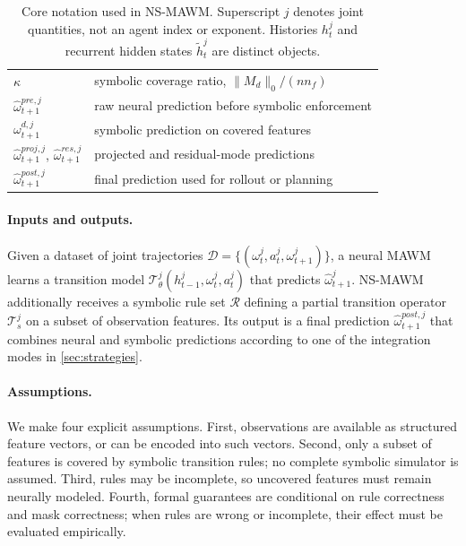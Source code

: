 \documentclass{article}
\theoremstyle{plain}
\theoremstyle{definition}
\theoremstyle{remark}
\begin{document}
\begin{table}[t]
\begin{tabular}{ll}
    $\kappa$                                                    & symbolic coverage ratio, $\|M_d\|_0/(n n_f)$          \\
    $\hat{\omega}^{pre,j}_{t+1}$                                & raw neural prediction before symbolic enforcement     \\
    $\omega^{d,j}_{t+1}$                                        & symbolic prediction on covered features               \\
    $\hat{\omega}^{proj,j}_{t+1}$, $\hat{\omega}^{res,j}_{t+1}$ & projected and residual-mode predictions               \\
    $\hat{\omega}^{post,j}_{t+1}$                               & final prediction used for rollout or planning         \\
    \bottomrule
  \end{tabular}
  \caption{Core notation used in NS-MAWM. Superscript $j$ denotes joint quantities, not an agent index or exponent. Histories $h_t^j$ and recurrent hidden states $\tilde{h}_t^j$ are distinct objects.}
  \label{tab:notation}
\end{table}

\paragraph{Inputs and outputs.}
Given a dataset of joint trajectories
$\mathcal{D}=\{(\omega^j_t,a^j_t,\omega^j_{t+1})\}$,
a neural MAWM learns a transition model
$\mathcal{T}^j_\theta(h^j_{t-1},\omega^j_t,a^j_t)$
that predicts $\hat{\omega}^j_{t+1}$.
NS-MAWM additionally receives a symbolic rule set $\mathcal{R}$ defining a partial transition operator $\mathcal{T}^j_s$ on a subset of observation features. Its output is a final prediction $\hat{\omega}^{post,j}_{t+1}$ that combines neural and symbolic predictions according to one of the integration modes in \autoref{sec:strategies}.

\paragraph{Assumptions.}
We make four explicit assumptions. First, observations are available as structured feature vectors, or can be encoded into such vectors. Second, only a subset of features is covered by symbolic transition rules; no complete symbolic simulator is assumed. Third, rules may be incomplete, so uncovered features must remain neurally modeled. Fourth, formal guarantees are conditional on rule correctness and mask correctness; when rules are wrong or incomplete, their effect must be evaluated empirically.
\end{document}
